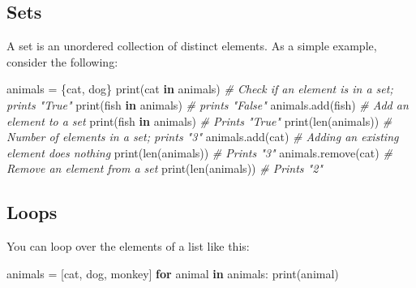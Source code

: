 \documentclass[
]{article}
\newenvironment{Shaded}{}{}
\newcommand{\BuiltInTok}[1]{#1}
\newcommand{\CommentTok}[1]{\textcolor[rgb]{0.38,0.63,0.69}{\textit{#1}}}
\newcommand{\ControlFlowTok}[1]{\textcolor[rgb]{0.00,0.44,0.13}{\textbf{#1}}}
\newcommand{\KeywordTok}[1]{\textcolor[rgb]{0.00,0.44,0.13}{\textbf{#1}}}
\newcommand{\NormalTok}[1]{#1}
\newcommand{\OperatorTok}[1]{\textcolor[rgb]{0.40,0.40,0.40}{#1}}
\newcommand{\StringTok}[1]{\textcolor[rgb]{0.25,0.44,0.63}{#1}}
\begin{document}
\hypertarget{sets}{%
\subsection{Sets}\label{sets}}

A set is an unordered collection of distinct elements. As a simple
example, consider the following:

\begin{Shaded}
\begin{Highlighting}[]
\NormalTok{animals }\OperatorTok{=}\NormalTok{ \{}\StringTok{\textquotesingle{}cat\textquotesingle{}}\NormalTok{, }\StringTok{\textquotesingle{}dog\textquotesingle{}}\NormalTok{\}}
\BuiltInTok{print}\NormalTok{(}\StringTok{\textquotesingle{}cat\textquotesingle{}} \KeywordTok{in}\NormalTok{ animals)   }\CommentTok{\# Check if an element is in a set; prints "True"}
\BuiltInTok{print}\NormalTok{(}\StringTok{\textquotesingle{}fish\textquotesingle{}} \KeywordTok{in}\NormalTok{ animals)  }\CommentTok{\# prints "False"}
\NormalTok{animals.add(}\StringTok{\textquotesingle{}fish\textquotesingle{}}\NormalTok{)       }\CommentTok{\# Add an element to a set}
\BuiltInTok{print}\NormalTok{(}\StringTok{\textquotesingle{}fish\textquotesingle{}} \KeywordTok{in}\NormalTok{ animals)  }\CommentTok{\# Prints "True"}
\BuiltInTok{print}\NormalTok{(}\BuiltInTok{len}\NormalTok{(animals))       }\CommentTok{\# Number of elements in a set; prints "3"}
\NormalTok{animals.add(}\StringTok{\textquotesingle{}cat\textquotesingle{}}\NormalTok{)        }\CommentTok{\# Adding an existing element does nothing}
\BuiltInTok{print}\NormalTok{(}\BuiltInTok{len}\NormalTok{(animals))       }\CommentTok{\# Prints "3"}
\NormalTok{animals.remove(}\StringTok{\textquotesingle{}cat\textquotesingle{}}\NormalTok{)     }\CommentTok{\# Remove an element from a set}
\BuiltInTok{print}\NormalTok{(}\BuiltInTok{len}\NormalTok{(animals))       }\CommentTok{\# Prints "2"}
\end{Highlighting}
\end{Shaded}

\hypertarget{loops}{%
\subsection{Loops}\label{loops}}

You can loop over the elements of a list like this:

\begin{Shaded}
\begin{Highlighting}[]
\NormalTok{animals }\OperatorTok{=}\NormalTok{ [}\StringTok{\textquotesingle{}cat\textquotesingle{}}\NormalTok{, }\StringTok{\textquotesingle{}dog\textquotesingle{}}\NormalTok{, }\StringTok{\textquotesingle{}monkey\textquotesingle{}}\NormalTok{]}
\ControlFlowTok{for}\NormalTok{ animal }\KeywordTok{in}\NormalTok{ animals:}
    \BuiltInTok{print}\NormalTok{(animal)}
\end{Highlighting}
\end{Shaded}
\end{document}
